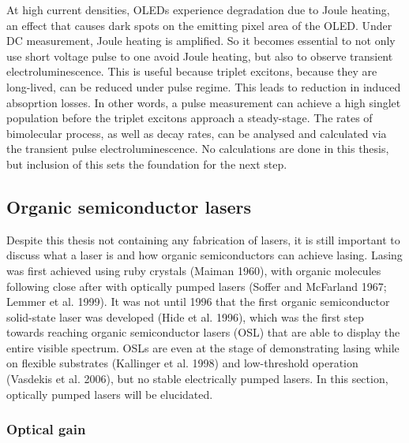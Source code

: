 \documentclass[
  letterpaper,
  DIV=11,
  numbers=noendperiod,
  oneside]{scrreprt}
\begin{document}
At high current densities, OLEDs experience degradation due to Joule
heating, an effect that causes dark spots on the emitting pixel area of
the OLED. Under DC measurement, Joule heating is amplified. So it
becomes essential to not only use short voltage pulse to one avoid Joule
heating, but also to observe transient electroluminescence. This is
useful because triplet excitons, because they are long-lived, can be
reduced under pulse regime. This leads to reduction in induced
absoprtion losses. In other words, a pulse measurement can achieve a
high singlet population before the triplet excitons approach a
steady-stage. The rates of bimolecular process, as well as decay rates,
can be analysed and calculated via the transient pulse
electroluminescence. No calculations are done in this thesis, but
inclusion of this sets the foundation for the next step.

\hypertarget{organic-semiconductor-lasers}{%
\subsection{Organic semiconductor
lasers}\label{organic-semiconductor-lasers}}

Despite this thesis not containing any fabrication of lasers, it is
still important to discuss what a laser is and how organic
semiconductors can achieve lasing. Lasing was first achieved using ruby
crystals (Maiman 1960), with organic molecules following close after
with optically pumped lasers (Soffer and McFarland 1967; Lemmer et al.
1999). It was not until 1996 that the first organic semiconductor
solid-state laser was developed (Hide et al. 1996), which was the first
step towards reaching organic semiconductor lasers (OSL) that are able
to display the entire visible spectrum. OSLs are even at the stage of
demonstrating lasing while on flexible substrates (Kallinger et al.
1998) and low-threshold operation (Vasdekis et al. 2006), but no stable
electrically pumped lasers. In this section, optically pumped lasers
will be elucidated.

\hypertarget{optical-gain}{%
\subsubsection{Optical gain}\label{optical-gain}}
\end{document}
